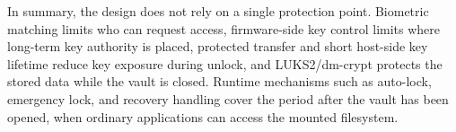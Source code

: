 In summary, the design does not rely on a single protection point. Biometric matching limits who can request access, firmware-side key control limits where long-term key authority is placed, protected transfer and short host-side key lifetime reduce key exposure during unlock, and LUKS2/dm-crypt protects the stored data while the vault is closed. Runtime mechanisms such as auto-lock, emergency lock, and recovery handling cover the period after the vault has been opened, when ordinary applications can access the mounted filesystem.
